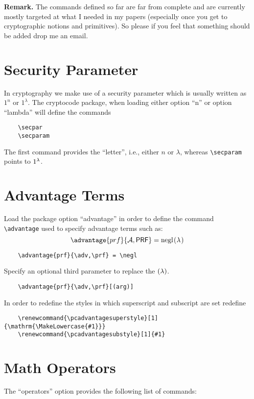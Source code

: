 \documentclass[a4paper]{report}
\begin{document}
\textbf{Remark. } The commands defined so far are far from complete and are currently mostly targeted at what I needed in my
papers (especially once you get to cryptographic notions and primitives). So please if you feel that something should be added
drop me an email.

\section{Security Parameter}
In cryptography we make use of a security parameter which is usually written as $1^n$ or $1^\lambda$. The cryptocode
package, when loading either option \enquote{n} or option \enquote{lambda} will define the commands
\begin{lstlisting}
	\secpar
	\secparam
\end{lstlisting}
The first command provides the \enquote{letter}, i.e., either $n$ or $\lambda$, whereas \lstinline$\secparam$ points
to $1^{\lambda}$.

\section{Advantage Terms}
Load the package option ``advantage'' in order to define the command \lstinline$\advantage$ used to specify advantage terms such as:
\[
\advantage{prf}{\adv,\prf} = \negl
\]
\begin{lstlisting}
	\advantage{prf}{\adv,\prf} = \negl
\end{lstlisting}
Specify an optional third parameter to replace the $(\lambda)$. 
\begin{lstlisting}
	\advantage{prf}{\adv,\prf}[(arg)]
\end{lstlisting}
In order to redefine the styles in which superscript and subscript are set redefine
\begin{lstlisting}
	\renewcommand{\pcadvantagesuperstyle}[1]{\mathrm{\MakeLowercase{#1}}}
	\renewcommand{\pcadvantagesubstyle}[1]{#1}
\end{lstlisting}

\section{Math Operators}
The \enquote{operators} option provides the following list of commands:
\end{document}
